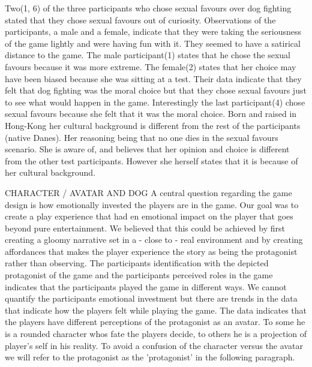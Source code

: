 Two(1, 6) of the three participants who chose sexual favours over dog fighting stated that they chose sexual favours out of curiosity. Observations of the participants, a male and a female, indicate that they were taking the seriousness of the game lightly and were having fun with it. They seemed to have a satirical distance to the game. The male participant(1) states that he chose the sexual favours because it was more extreme. The female(2) states that her choice may have been biased because she was sitting at a test. Their data indicate that they felt that dog fighting was the moral choice but that they chose sexual favours just to see what would happen in the game. Interestingly the last participant(4) chose sexual favours because she felt that it was the moral choice. Born and raised in Hong-Kong her cultural background is different from the rest of the participants (native Danes). Her reasoning being that no one dies in the sexual favours scenario. She is aware of, and believes that her opinion and choice is different from the other test participants. However she herself states that it is because of her cultural background.

CHARACTER / AVATAR AND DOG
A central question regarding the game design is how emotionally invested the players are in the game. Our goal was to create a play experience that had en emotional impact on the player that goes beyond pure entertainment. We believed that this could be achieved by first creating a gloomy narrative set in a - close to - real environment and by creating affordances that makes the player experience the story as being the protagonist rather than observing.  The participants identification with the depicted protagonist of the game and the participants perceived roles in the game indicates that the participants played the game in different ways. We cannot quantify the participants emotional investment but there are trends in the data that indicate how the players felt while playing the game. The data indicates that the players have different perceptions of the protagonist as an avatar. To some he is a rounded character whos fate the players decide, to others he is a projection of player's self in his reality. To avoid a confusion of the character versus the avatar we will refer to the protagonist as the 'protagonist' in the following paragraph.

